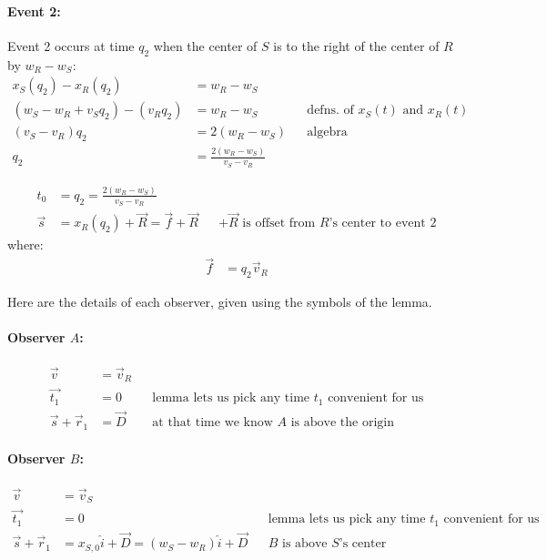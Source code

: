 \documentclass[a4paper]{article}
\theoremstyle{plain}
\theoremstyle{definition}
\newcommand{\vect}[1]{\vec{#1}}
\newcommand{\hatvec}[1]{\hat{#1}}
\newcommand{\ihat}{\hatvec{i}}
\begin{document}
\paragraph{Event 2:}

Event 2 occurs at time $q_2$ when the center of $S$ is to the right of
the center of $R$ by $w_R - w_S$:
\begin{align}
x_S(q_2) - x_R(q_2) & = w_R - w_S \nonumber \\
(w_S - w_R + v_S q_2) - (v_R q_2) & = w_R - w_S & & \text{defns. of $x_S(t)$ and $x_R(t)$} \nonumber \\
(v_S - v_R) q_2 & = 2(w_R - w_S) & & \text{algebra} \nonumber \\
q_2 & = \frac{2(w_R - w_S)}{v_S - v_R} \label{eqn:scen3b-event2time}
\end{align}

\begin{align}
t_0 & = q_2 = \frac{2(w_R - w_S)}{v_S - v_R} \\
\vect{s} & = x_R(q_2) + \vect{R} = \vect{f} + \vect{R} & & \text{$+\vect{R}$ is offset from $R$'s center to event 2}
\end{align}
where:
\begin{align}
\vect{f} & = q_2 \vect{v}_R
\end{align}

Here are the details of each observer, given using the symbols of the
lemma.


\paragraph{Observer $A$:}

\begin{align}
\vect{v} & = \vect{v}_R \\
\vect{t_1} & = 0 & & \text{lemma lets us pick any time $t_1$ convenient for us} \\
\vect{s} + \vect{r}_1 & = \vect{D} & & \text{at that time we know $A$ is above the origin}
\end{align}


\paragraph{Observer $B$:}

\begin{align}
\vect{v} & = \vect{v}_S \\
\vect{t_1} & = 0 & & \text{lemma lets us pick any time $t_1$ convenient for us} \\
\vect{s} + \vect{r}_1 & = x_{S,0}\ihat + \vect{D} = (w_S - w_R)\ihat + \vect{D} & & \text{$B$ is above $S$'s center}
\end{align}
\end{document}
